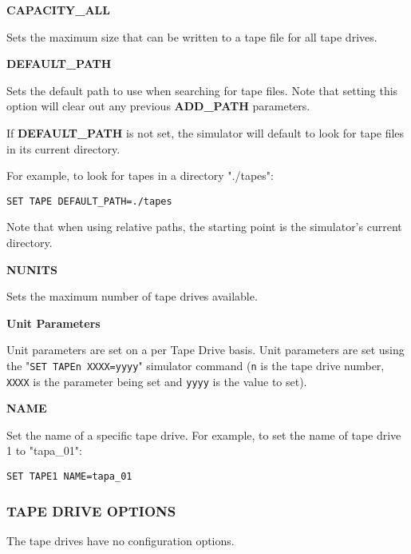 \textbf{CAPACITY\_ALL}

\begin{adjustwidth}{5ex}{1ex}
	Sets the maximum size that can be written to a tape file for all tape drives.
\end{adjustwidth}

\textbf{DEFAULT\_PATH}

\begin{adjustwidth}{5ex}{1ex}
	Sets the default path to use when searching for tape files. Note that setting this option will clear
	out any previous \textbf{ADD\_PATH} parameters.
	
	If \textbf{DEFAULT\_PATH} is not set, the simulator will default to look for tape files in its current directory.

	For example, to look for tapes in a directory "./tapes":
\begin{adjustwidth}{5ex}{1ex}
	\texttt{SET TAPE DEFAULT\_PATH=./tapes}
\end{adjustwidth}
	Note that when using relative paths, the starting point is the simulator's current directory.
\end{adjustwidth}

\textbf{NUNITS}

\begin{adjustwidth}{5ex}{1ex}
	Sets the maximum number of tape drives available.
\end{adjustwidth}


\textbf{Unit Parameters}

Unit parameters are set on a per Tape Drive basis. Unit parameters are set using
the "\texttt{SET TAPEn XXXX=yyyy}" simulator command (\texttt{n} is the tape drive number, \texttt{XXXX} is
the parameter being set and \texttt{yyyy} is the value to set).

\textbf{NAME}

\begin{adjustwidth}{5ex}{1ex}
	Set the name of a specific tape drive. For example, to set the name of tape drive 1 to "tapa\_01":
\begin{adjustwidth}{5ex}{1ex}
	\texttt{SET TAPE1 NAME=tapa\_01}
\end{adjustwidth}
\end{adjustwidth}


\subsubsection[Tape Drive Options]{TAPE DRIVE OPTIONS}

The tape drives have no configuration options.

